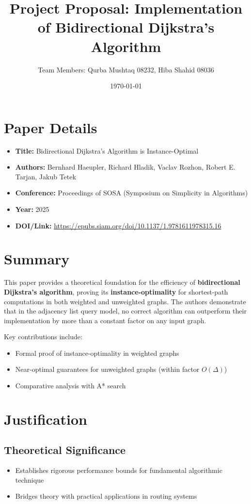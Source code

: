 \documentclass[12pt]{article}
\title{Project Proposal: Implementation of Bidirectional Dijkstra's Algorithm}
\author{Team Members: Qurba Mushtaq 08232, Hiba Shahid 08036}
\date{\today}
\begin{document}
\maketitle

\section*{Paper Details}
\begin{itemize}
    \item \textbf{Title:} Bidirectional Dijkstra's Algorithm is Instance-Optimal
    \item \textbf{Authors:} Bernhard Haeupler, Richard Hladik, Vaclav Rozhon, Robert E. Tarjan, Jakub Tetek
    \item \textbf{Conference:} Proceedings of SOSA (Symposium on Simplicity in Algorithms)
    \item \textbf{Year:} 2025
    \item \textbf{DOI/Link:} \url{https://epubs.siam.org/doi/10.1137/1.9781611978315.16}
\end{itemize}

\section{Summary}
This paper provides a theoretical foundation for the efficiency of \textbf{bidirectional Dijkstra's algorithm}, proving its \textbf{instance-optimality} for shortest-path computations in both weighted and unweighted graphs. The authors demonstrate that in the adjacency list query model, no correct algorithm can outperform their implementation by more than a constant factor on any input graph.

Key contributions include:
\begin{itemize}
    \item Formal proof of instance-optimality in weighted graphs
    \item Near-optimal guarantees for unweighted graphs (within factor $O(\Delta)$)
    \item Comparative analysis with A* search
\end{itemize}

\section{Justification}
\subsection{Theoretical Significance}
\begin{itemize}
    \item Establishes rigorous performance bounds for fundamental algorithmic technique
    \item Bridges theory with practical applications in routing systems
\end{itemize}
\end{document}
